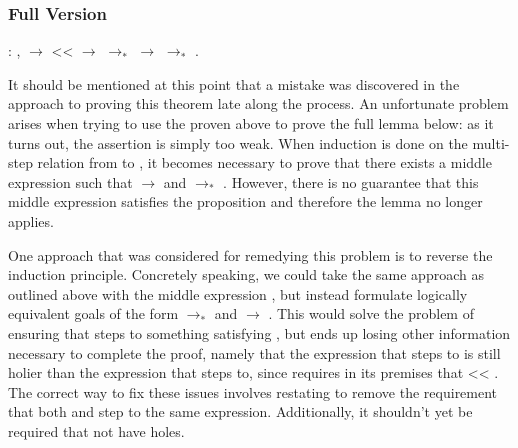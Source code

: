 \documentclass[12pt]{report}
\begin{document}
\subsubsection{Full Version}

\begin{coqdoccode}
\coqdocemptyline
\coqdocindent{1.00em}
  : \coqdockw{\ensuremath{\forall}}   ,\coqdoceol
\coqdocindent{2.00em}
  \ensuremath{\rightarrow}\coqdoceol
\coqdocindent{2.00em}
 <<  \ensuremath{\rightarrow}\coqdoceol
\coqdocindent{2.00em}
 $\to_*$  \ensuremath{\rightarrow}\coqdoceol
\coqdocindent{2.00em}
 $\to_*$ .\coqdoceol
\coqdocemptyline
\end{coqdoccode}

It should be mentioned at this point that a mistake was discovered in
the approach to proving this theorem late along the process. An
unfortunate problem arises when trying to use the
 proven above to prove the full
 lemma below: as it turns out, the assertion
is simply too weak. When induction is done on the multi-step relation
from  to , it becomes necessary to prove
that there exists a middle expression  such that
 $\to$  and  $\to_*$ .
However, there is no guarantee that this middle expression satisfies
the  proposition and therefore the
 lemma no longer applies. 

One approach that was considered for remedying this problem is to
reverse the induction principle. Concretely speaking, we could take
the same approach as outlined above with the middle expression
, but instead formulate logically equivalent goals of
the form  $\to_*$  and  $\to$
. This would solve the problem of ensuring that
 steps to something satisfying , but
ends up losing other information necessary to complete the proof,
namely that the expression  that  steps to
is still holier than the expression  that
 steps to, since 
requires in its premises that  << . The
correct way to fix these issues involves restating
 to remove the requirement that
both  and  step to the same expression.
Additionally, it shouldn't yet be required that  not
have holes.
\end{document}

